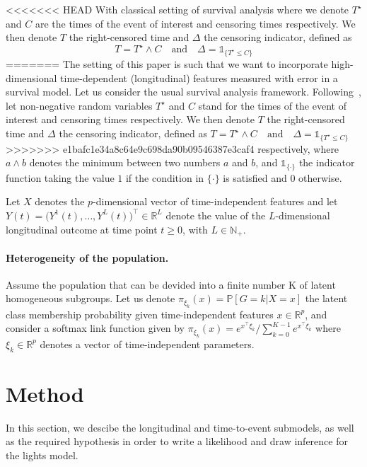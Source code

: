 \documentclass[11pt]{article}
\newcommand{\ind}[1]{\mathds{1}_{#1}}
\newcommand{\R}{\mathds R}
\newcommand{\N}{\mathds N}
\renewcommand{\P}{\mathds P}
\begin{document}
<<<<<<< HEAD
With classical setting of survival analysis where we denote $T^\star$ and $C$ are the times of the event of interest and censoring times respectively.
We then denote $T$ the right-censored time and $\Delta$ the censoring indicator, defined as 
\begin{equation*}
T = T^\star \wedge C \quad \text{and} \quad \Delta = \ind{\{T^\star \leq C\}}
\end{equation*}
=======
The setting of this paper is such that we want to incorporate high-dimensional time-dependent (longitudinal) features measured with error in a survival model. Let us consider the usual survival analysis framework.
Following~\citet{andersen2012statistical}, let non-negative random variables $T^\star$ and $C$ stand for the times of the event of interest and censoring times respectively.
We then denote $T$ the right-censored time and $\Delta$ the censoring indicator, defined as $T = T^\star \wedge C \quad \text{and} \quad \Delta = \ind{\{T^\star \leq C\}}$
>>>>>>> e1bafc1e34a8c64e9c698da90b09546387e3caf4
respectively, where $a \wedge b$ denotes the minimum between two numbers $a$ and $b$, and $\ind{\{\cdot\}}$ the indicator function taking the value $1$ if the condition in $\{\cdot\}$ is satisfied and $0$ otherwise.

Let $X$ denotes the $p$-dimensional vector of time-independent features and let  $Y(t) = \big(Y^1(t), \ldots, Y^L(t) \big)^\top \in \R^L$ denote the value of the $L$-dimensional longitudinal outcome at time point $t \geq 0$, with $L \in \N_+$.

\paragraph{Heterogeneity of the population.}

Assume the population that can be devided into a finite number K of latent homogeneous subgroups. Let us denote $\pi_{\xi_k}(x) = \P[G=k|X=x]$ the latent class membership probability given time-independent features $x \in \R^p$, and consider a softmax link function given by $\pi_{\xi_k}(x) = e^{x^\top\xi_k} / \sum_{k=0}^{K-1}e^{x^\top\xi_k}$
where $\xi_k \in \R^p$ denotes a vector of time-independent parameters.

\section{Method}
\label{sec:Method}

In this section, we descibe the longitudinal and time-to-event submodels, as well as the required hypothesis in order to write a likelihood and draw inference for the lights model.
\end{document}
